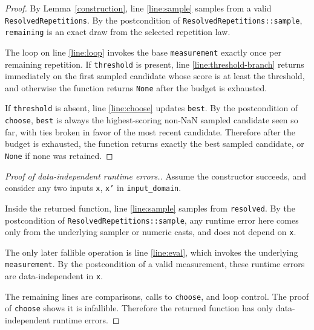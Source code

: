 \documentclass{article}
\begin{document}
\begin{proof}
By Lemma~\ref{construction}, line \ref{line:sample} samples from a valid
\texttt{ResolvedRepetitions}. By the postcondition of
\texttt{ResolvedRepetitions::sample},
\texttt{remaining} is an exact draw from the selected repetition law.

The loop on line \ref{line:loop} invokes the base \texttt{measurement} exactly once per remaining
repetition. If \texttt{threshold} is present, line \ref{line:threshold-branch} returns
immediately on the first sampled candidate whose score is at least the threshold, and otherwise the
function returns \texttt{None} after the budget is exhausted.

If \texttt{threshold} is absent, line \ref{line:choose} updates \texttt{best}. By the postcondition
of \texttt{choose}, \texttt{best} is always the
highest-scoring non-NaN sampled candidate seen so far, with ties broken in favor of the most recent
candidate. Therefore after the budget is exhausted, the function returns exactly the best sampled
candidate, or \texttt{None} if none was retained.
\end{proof}

\begin{proof}[Proof of data-independent runtime errors.]
Assume the constructor succeeds, and consider any two inputs \texttt{x}, \texttt{x'} in
\texttt{input\_domain}.

Inside the returned function, line \ref{line:sample} samples from \texttt{resolved}. By the
postcondition of \texttt{ResolvedRepetitions::sample}, any runtime error here comes only from the
underlying sampler or numeric casts, and does not depend on \texttt{x}.

The only later fallible operation is line \ref{line:eval}, which invokes the underlying
\texttt{measurement}. By the postcondition of a valid measurement, these runtime errors are
data-independent in \texttt{x}.

The remaining lines are comparisons, calls to \texttt{choose}, and loop control. The proof of
\texttt{choose} shows it is infallible. Therefore the returned function has only data-independent
runtime errors.
\end{proof}
\end{document}
